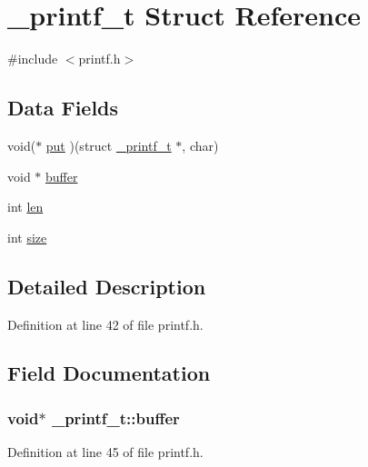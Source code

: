 \hypertarget{struct__printf__t}{}\section{\+\_\+printf\+\_\+t Struct Reference}
\label{struct__printf__t}


{\ttfamily \#include $<$printf.\+h$>$}

\subsection*{Data Fields}
\begin{DoxyCompactItemize}
\item 
void($\ast$ \hyperlink{struct__printf__t_a3ef8eb0143b93d4446b04c6ce9313be7}{put} )(struct \hyperlink{struct__printf__t}{\+\_\+printf\+\_\+t} $\ast$, char)
\item 
void $\ast$ \hyperlink{struct__printf__t_ad35884151d0be6667caafad8caacc76f}{buffer}
\item 
int \hyperlink{struct__printf__t_a5139902cde74159b79e6418a34712bee}{len}
\item 
int \hyperlink{struct__printf__t_a38c7a430cec9b063bf6df7a100d3abaa}{size}
\end{DoxyCompactItemize}


\subsection{Detailed Description}


Definition at line 42 of file printf.\+h.



\subsection{Field Documentation}
\subsubsection[{\texorpdfstring{buffer}{buffer}}]{\setlength{\rightskip}{0pt plus 5cm}void$\ast$ \+\_\+printf\+\_\+t\+::buffer}\hypertarget{struct__printf__t_ad35884151d0be6667caafad8caacc76f}{}\label{struct__printf__t_ad35884151d0be6667caafad8caacc76f}


Definition at line 45 of file printf.\+h.




